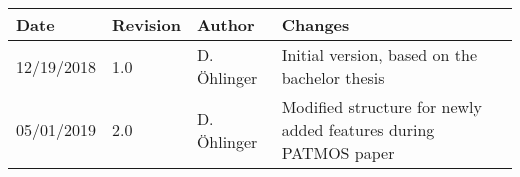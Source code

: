 \begin{center}
\begin{tabularx}{\linewidth}{ |l|l|l|X| } 
 \hline
 Date & Revision & Author & Changes \\ 
 \hline
 12/19/2018 & 1.0 & D. \"Ohlinger & Initial version, based on the bachelor 
 thesis \cite{Oeh18:Bthesis} \\ 
 \hline
 05/01/2019 & 2.0 & D. \"Ohlinger & Modified structure for newly added features 
 during PATMOS paper  \\ 
 \hline
\end{tabularx}
\end{center}